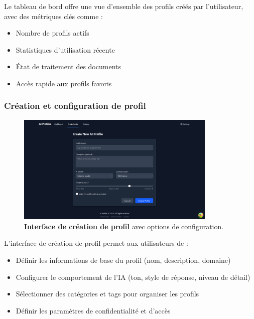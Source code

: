 Le tableau de bord offre une vue d'ensemble des profils créés par l'utilisateur, avec des métriques clés comme :

\begin{itemize}
  \item Nombre de profils actifs
  \item Statistiques d'utilisation récente
  \item État de traitement des documents
  \item Accès rapide aux profils favoris
\end{itemize}

\subsubsection{Création et configuration de profil}

\begin{figure}[H]
  \centering
  \includegraphics[width=0.85\textwidth,keepaspectratio]{pfe-pics/ai-profile-creation/Screenshot 2025-06-09 at 23-16-31 Vite React TS.png}
  \caption{\textbf{Interface de création de profil} avec options de configuration.}
  \label{fig:profile_creation}
\end{figure}

L'interface de création de profil permet aux utilisateurs de :

\begin{itemize}
  \item Définir les informations de base du profil (nom, description, domaine)
  \item Configurer le comportement de l'IA (ton, style de réponse, niveau de détail)
  \item Sélectionner des catégories et tags pour organiser les profils
  \item Définir les paramètres de confidentialité et d'accès
\end{itemize}

